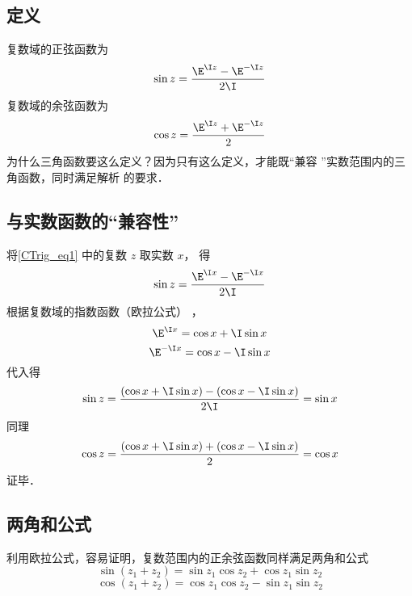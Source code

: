 \subsection{定义}
复数域的正弦函数为
\begin{equation}\label{CTrig_eq1}
\sin z = \frac{\E^{\I z} - \E^{ - \I z}}{2\I}
\end{equation}
复数域的余弦函数为
\begin{equation}\label{CTrig_eq2}
\cos z = \frac{{{\E^{\I z}} + {\E^{ - \I z}}}}{2}
\end{equation}
为什么三角函数要这么定义？因为只有这么定义，才能既“兼容%
”实数范围内的三角函数，同时满足解析%
的要求．

\subsection{与实数函数的“兼容性”}
将\autoref{CTrig_eq1} 中的复数 $z$ 取实数 $x$， 得
\begin{equation}
\sin z = \frac{{{\E^{\I x}} - {\E^{ - \I x}}}}{{2\I}}
\end{equation} 
根据复数域的指数函数（欧拉公式）
，%
 \begin{equation}
{\E^{\I x}} = \cos x + \I\sin x
\end{equation} 
\begin{equation}
{\E^{ - \I x}} = \cos x - \I \sin x
\end{equation} 
代入得
\begin{equation}
\sin z = \frac{{\left( {\cos x + \I\sin x} \right) - \left( {\cos x - \I\sin x} \right)}}{{2\I}} = \sin x
\end{equation}  
同理
\begin{equation}
\cos z = \frac{{\left( {\cos x + \I\sin x} \right) + \left( {\cos x - \I\sin x} \right)}}{2} = \cos x
\end{equation}   
证毕．

\subsection{两角和公式}
利用欧拉公式，容易证明，复数范围内的正余弦函数同样满足两角和公式
\begin{equation}\label{CTrig_eq3}
\sin \left( {{z_1} + {z_2}} \right) = \sin {z_1}\cos {z_2} + \cos {z_1}\sin {z_2}
\end{equation}
\begin{equation}\label{CTrig_eq4}
\cos \left( {{z_1} + {z_2}} \right) = \cos {z_1}\cos {z_2} - \sin {z_1}\sin {z_2}
\end{equation}
